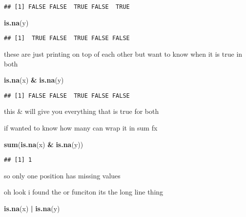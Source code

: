 \documentclass[]{article}
\newenvironment{Shaded}{\begin{snugshade}}{\end{snugshade}}
\newcommand{\KeywordTok}[1]{\textcolor[rgb]{0.13,0.29,0.53}{\textbf{#1}}}
\newcommand{\StringTok}[1]{\textcolor[rgb]{0.31,0.60,0.02}{#1}}
\newcommand{\OperatorTok}[1]{\textcolor[rgb]{0.81,0.36,0.00}{\textbf{#1}}}
\newcommand{\NormalTok}[1]{#1}
\begin{document}
\begin{verbatim}
## [1] FALSE FALSE  TRUE FALSE  TRUE
\end{verbatim}

\begin{Shaded}
\begin{Highlighting}[]
\KeywordTok{is.na}\NormalTok{(y)}
\end{Highlighting}
\end{Shaded}

\begin{verbatim}
## [1]  TRUE FALSE  TRUE FALSE FALSE
\end{verbatim}

these are just printing on top of each other but want to know when it is
true in both

\begin{Shaded}
\begin{Highlighting}[]
\KeywordTok{is.na}\NormalTok{(x) }\OperatorTok{&}\StringTok{ }\KeywordTok{is.na}\NormalTok{(y)}
\end{Highlighting}
\end{Shaded}

\begin{verbatim}
## [1] FALSE FALSE  TRUE FALSE FALSE
\end{verbatim}

this \& will give you everything that is true for both

if wanted to know how many can wrap it in sum fx

\begin{Shaded}
\begin{Highlighting}[]
\KeywordTok{sum}\NormalTok{(}\KeywordTok{is.na}\NormalTok{(x) }\OperatorTok{&}\StringTok{ }\KeywordTok{is.na}\NormalTok{(y))}
\end{Highlighting}
\end{Shaded}

\begin{verbatim}
## [1] 1
\end{verbatim}

so only one position has missing values

oh look i found the or funciton its the long line thing

\begin{Shaded}
\begin{Highlighting}[]
\KeywordTok{is.na}\NormalTok{(x) }\OperatorTok{|}\StringTok{ }\KeywordTok{is.na}\NormalTok{(y)}
\end{Highlighting}
\end{Shaded}
\end{document}
